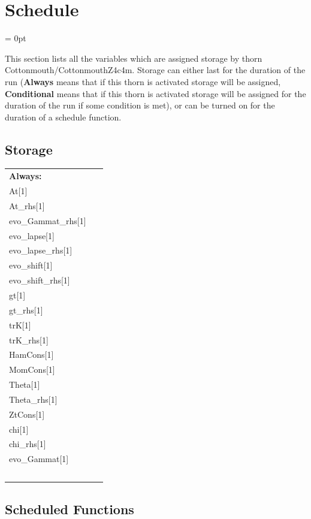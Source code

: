
\section{Schedule} 


\parskip = 0pt


\noindent This section lists all the variables which are assigned storage by thorn Cottonmouth/CottonmouthZ4c4m.  Storage can either last for the duration of the run ({\bf Always} means that if this thorn is activated storage will be assigned, {\bf Conditional} means that if this thorn is activated storage will be assigned for the duration of the run if some condition is met), or can be turned on for the duration of a schedule function.


\subsection*{Storage}

\hspace{5mm}

 \begin{tabular*}{160mm}{ll} 

{\bf Always:}&  ~ \\ 
 At[1] & ~\\ 
 At\_rhs[1] & ~\\ 
 evo\_Gammat\_rhs[1] & ~\\ 
 evo\_lapse[1] & ~\\ 
 evo\_lapse\_rhs[1] & ~\\ 
 evo\_shift[1] & ~\\ 
 evo\_shift\_rhs[1] & ~\\ 
 gt[1] & ~\\ 
 gt\_rhs[1] & ~\\ 
 trK[1] & ~\\ 
 trK\_rhs[1] & ~\\ 
 HamCons[1] & ~\\ 
 MomCons[1] & ~\\ 
 Theta[1] & ~\\ 
 Theta\_rhs[1] & ~\\ 
 ZtCons[1] & ~\\ 
 chi[1] & ~\\ 
 chi\_rhs[1] & ~\\ 
 evo\_Gammat[1] & ~\\ 
~ & ~\\ 
\end{tabular*} 


\subsection*{Scheduled Functions}
\vspace{5mm}

